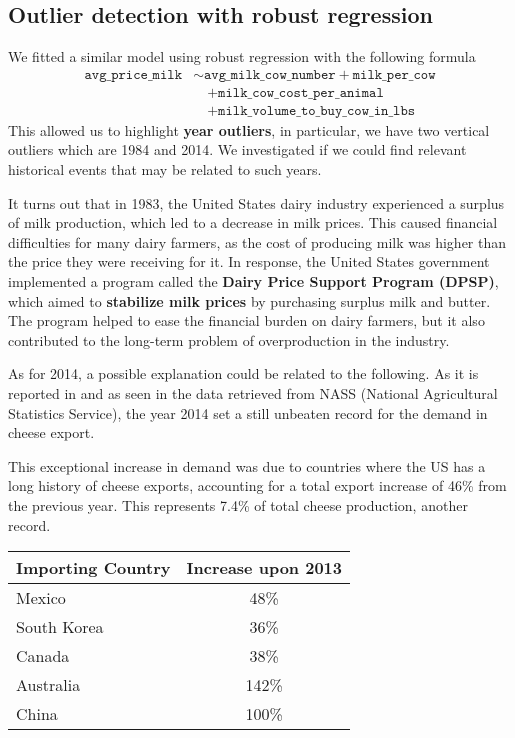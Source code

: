 \subsection{Outlier detection with robust regression}

We fitted a similar model using robust regression with the following formula
\begin{align*}
    \texttt{avg\_price\_milk} &\sim \texttt{avg\_milk\_cow\_number} + \texttt{milk\_per\_cow} \\
    & \quad + \texttt{milk\_cow\_cost\_per\_animal}\\
    & \quad + \texttt{milk\_volume\_to\_buy\_cow\_in\_lbs}
\end{align*}
This allowed us to highlight \textbf{year outliers}, in particular, we have two vertical outliers which are 1984 and 2014.
We investigated if we could find relevant historical events that may be related to such years.

It turns out that in 1983, the United States dairy industry experienced a surplus of milk production, which led to a decrease in milk prices. This caused financial difficulties for many dairy farmers, as the cost of producing milk was higher than the price they were receiving for it. In response, the United States government implemented a program called the \textbf{Dairy Price Support Program (DPSP)}, which aimed to \textbf{stabilize milk prices} by purchasing surplus milk and butter. The program helped to ease the financial burden on dairy farmers, but it also contributed to the long-term problem of overproduction in the industry.

As for 2014, a possible explanation could be related to the following. As it is reported in \cite{2014_export} and as seen in the data retrieved from NASS (National Agricultural Statistics Service), the year 2014 set a still unbeaten record for the demand in cheese export. 

This exceptional increase in demand was due to countries where the US has a long history of cheese exports, accounting for a total export increase of 46\% from the previous year. This represents 7.4\% of total cheese production, another record.

\begin{table}[H]
    \centering
    \begin{tabular}{lc}
    \toprule
        Importing Country & Increase upon 2013\\
    \midrule
    Mexico & 48\% \\
    South Korea & 36\% \\
    Canada & 38\% \\
    Australia & 142\% \\
    China & 100\% \\
    \bottomrule
    \end{tabular}
\end{table}


